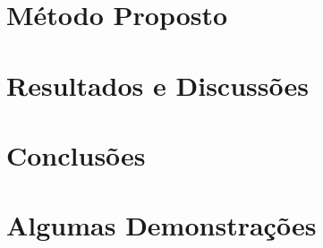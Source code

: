 \documentclass[grad,numbers]{coppe}
\begin{document}
  
  \chapter{Método Proposto}
  
  
  
  \chapter{Resultados e Discussões}
  
  
  
  \chapter{Conclusões}
  
  
  
  

  \backmatter
  
  

  \appendix
  \chapter{Algumas Demonstrações}
\end{document}
